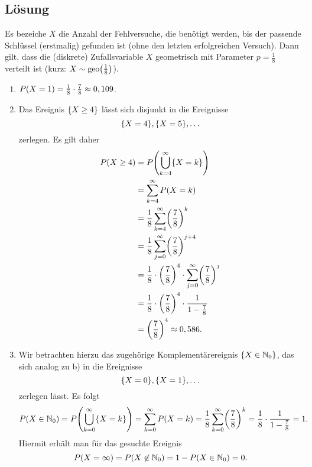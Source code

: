\documentclass{exercise}
\begin{document}
    \subsection*{Lösung}
    Es bezeiche \(X\) die Anzahl der Fehlversuche, die benötigt werden, bis der passende Schlüssel (erstmalig) gefunden ist (ohne den letzten erfolgreichen Versuch).
    Dann gilt, dass die (diskrete) Zufallsvariable \(X\) geometrisch mit Parameter \(p = \frac{1}{8}\) verteilt ist (kurz: \(X \sim \geo\parentheses*{\frac{1}{8}}\)).
    \begin{enumerate}
        \item \(P\parentheses*{X = 1} = \frac{1}{8} \cdot \frac{7}{8} \approx 0,109\).
        \item Das Ereignis \(\braces*{X \ge 4}\) lässt sich disjunkt in die Ereignisse
        \[
            \braces*{X = 4}, \braces*{X = 5}, \ldots
        \]
        zerlegen.
        Es gilt daher
        \begin{align*}
            P\parentheses*{X \ge 4} &= P\parentheses*{\bigcup_{k = 4}^\infty \braces*{X = k}}\\
            &= \sum_{k = 4}^\infty P\parentheses*{X = k}\\
            &= \frac{1}{8}\sum_{k = 4}^\infty \parentheses*{\frac{7}{8}}^k\\
            &= \frac{1}{8}\sum_{j = 0}^\infty \parentheses*{\frac{7}{8}}^{j + 4}\\
            &= \frac{1}{8} \cdot \parentheses*{\frac{7}{8}}^4 \cdot \sum_{j = 0}^\infty \parentheses*{\frac{7}{8}}^j\\
            &= \frac{1}{8} \cdot \parentheses*{\frac{7}{8}}^4 \cdot \frac{1}{1 - \frac{7}{8}}\\
            &= \parentheses*{\frac{7}{8}}^4 \approx 0,586.
        \end{align*}
        \item Wir betrachten hierzu das zugehörige Komplementärereignis \(\braces*{X \in \N_0}\), das sich analog zu b) in die Ereignisse
        \[
            \braces*{X = 0}, \braces*{X = 1}, \ldots
        \]
        zerlegen lässt.
        Es folgt
        \[
            P\parentheses*{X \in \N_0} = P\parentheses*{\bigcup_{k = 0}^\infty \braces*{X = k}} = \sum_{k = 0}^\infty P\parentheses*{X = k} = \frac{1}{8}\sum_{k = 0}^\infty \parentheses*{\frac{7}{8}}^k = \frac{1}{8} \cdot \frac{1}{1 - \frac{7}{8}} = 1.
        \]
        Hiermit erhält man für das gesuchte Ereignis
        \[
            P\parentheses*{X = \infty} = P\parentheses*{X \not\in \N_0} = 1 - P\parentheses*{X \in \N_0} = 0.
        \]
    \end{enumerate}
\end{document}
